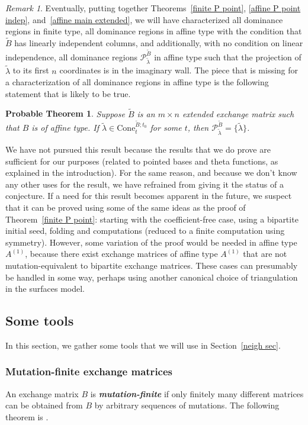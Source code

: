\documentclass{amsart}
\newtheorem{probable}[proposition]{Probable Theorem}
\theoremstyle{definition}
\theoremstyle{remark}
\newtheorem{remark}[proposition]{Remark}
\numberwithin{equation}{section}
\newcommand{\newword}[1]{\textbf{\emph{#1}}}
\newcommand{\set}[1]{{\lbrace #1 \rbrace}}
\newcommand{\0}{{\mathbf{0}}}
\newcommand{\Cone}{\mathrm{Cone}}
\newcommand{\tB}{{\widetilde{B}}}
\renewcommand{\P}{\mathcal{P}}
\newcommand{\afftype}[1]{{#1^{(1)}}}
\begin{document}
\begin{remark}\label{affine P point remark}
  Eventually, putting together Theorems~\ref{finite P point}, \ref{affine P point indep}, and~\ref{affine main extended}, we will have characterized all dominance regions in finite type, all dominance regions in affine type with the condition that $\tB$ has linearly independent columns, and additionally, with no condition on linear independence, all dominance regions $\P_{\tilde\lambda}^\tB$ in affine type such that the projection of $\tilde\lambda$ to its first $n$ coordinates is in the imaginary wall.
The piece that is missing for a characterization of all dominance regions in affine type is the following statement that is likely to be true.

\begin{probable}\label{affine P point} 
Suppose $\tB$ is an $m\times n$ extended exchange matrix such that $B$ is of affine type.
  If $\tilde\lambda\in\Cone^{\tB;t_0}_t$ for some $t$, then $\P^\tB_{\tilde\lambda}=\set{\tilde\lambda}$.
\end{probable}

We have not pursued this result because the results that we do prove are sufficient for our purposes (related to pointed bases and theta functions, as explained in the introduction).
For the same reason, and because we don't know any other uses for the result, we have refrained from giving it the status of a conjecture. 
If a need for this result becomes apparent in the future, we suspect that it can be proved using some of the same ideas as the proof of Theorem~\ref{finite P point}:
starting with the coefficient-free case, using a bipartite initial seed, folding and computations (reduced to a finite computation using symmetry).
However, some variation of the proof would be needed in affine type $\afftype A$, because there exist exchange matrices of affine type $\afftype A$ that are not mutation-equivalent to bipartite exchange matrices.
These cases can presumably be handled in some way, perhaps using another canonical choice of triangulation in the surfaces model.
\end{remark}


\subsection{Some tools}
In this section, we gather some tools that we will use in Section~\ref{neigh sec}.

\subsubsection{Mutation-finite exchange matrices}\label{mut fin sec}
An exchange matrix $B$ is \newword{mutation-finite} if only finitely many different matrices can be obtained from $B$ by arbitrary sequences of mutations.
The following theorem is \cite[Theorem~2.8]{FeShTu}.  
\end{document}
